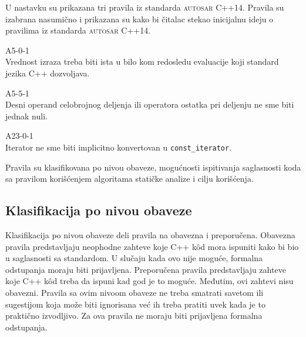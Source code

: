 \documentclass[12pt,oneside]{memoir}
\begin{document}
U nastavku su prikazana tri pravila iz standarda \textsc{autosar} C++14. Pravila su izabrana nasumi\v{c}no i prikazana su kako bi \v{c}italac stekao
inicijalnu ideju o pravilima iz standarda \textsc{autosar} C++14.
\begin{center}
\begin{tcolorbox}
 A5-0-1  \\
 Vrednost izraza treba biti ista u bilo kom redosledu evaluacije koji standard jezika C++ dozvoljava.
\end{tcolorbox}
\end{center}

\begin{center}
\begin{tcolorbox}
 A5-5-1  \\
 Desni operand celobrojnog deljenja ili operatora ostatka pri deljenju ne sme biti jednak nuli.
\end{tcolorbox}
\end{center}

\begin{center}
\begin{tcolorbox}
 A23-0-1  \\
 Iterator ne sme biti implicitno konvertovan u \texttt{const\_iterator}.
\end{tcolorbox}
\end{center}
Pravila su klasifikovana po nivou obaveze, mogućnosti ispitivanja saglasnosti koda sa pravilom korišćenjem algoritama
statičke analize i cilju korišćenja.

\subsection{Klasifikacija po nivou obaveze}
Klasifikacija po nivou obaveze deli pravila na obavezna i preporučena.
Obavezna pravila predstavljaju neophodne zahteve koje C++ k\^{o}d mora ispuniti kako bi bio u saglasnosti sa standardom. U slučaju kada ovo nije moguće,
formalna odstupanja moraju biti prijavljena.
Preporučena pravila predstavljaju zahteve koje C++ k\^{o}d treba da ispuni kad god je to mogu\'{c}e. Međutim, ovi zahtevi nisu obavezni. Pravila
sa ovim nivoom obaveze ne treba smatrati savetom ili sugestijom koja može biti ignorisana ve\'{c} ih treba pratiti uvek kada je to prakti\v{c}no izvodljivo. Za ova pravila ne moraju biti prijavljena formalna odstupanja.
\end{document}
